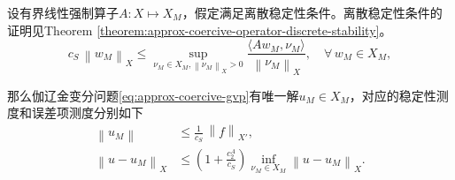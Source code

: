 \begin{theorem}[齐亚引理]
  \label{theorem:approx-coercive-cea-lemma}
  设有界线性强制算子$A: X \mapsto X_{M}$，假定满足离散稳定性条件。离散稳定性条件的证明见Theorem \ref{theorem:approx-coercive-operator-discrete-stability}。
  \begin{equation}
    \label{eq:approx-coercive-operator-discrete-stability}
    c_{S} \, \left\| w_{M} \right\|_{X}
    \le \sup_{\nu_{M} \in X_{M}, \left\| \nu_{M} \right\|_{X} > 0}
    \frac{
    \langle A w_{M}, \nu_{M} \rangle
    }{
    \left\| \nu_{M} \right\|_{X}
    }, \quad \forall \, w_{M} \in X_{M},
  \end{equation}

  那么伽辽金变分问题\eqref{eq:approx-coercive-gvp}有唯一解$u_{M} \in X_{M}$，对应的稳定性测度和误差项测度分别如下
  \begin{align}
    \label{eq:approx-coercive-cea-stability}
    \left\| u_{M} \right\| &\le \frac{1}{c_{S}} \, \left\| f \right\|_{X'}, \\
    \label{eq:approx-coercive-cea-error}
    \left\| u - u_{M} \right\|_{X} & \le
    \left( 1 + \frac{c_{2}^{A}}{c_{S}} \right)
    \inf_{\nu_{M} \in X_{M}}
    \left\| u - u_{M} \right\|_{X}.
  \end{align}
\end{theorem}
